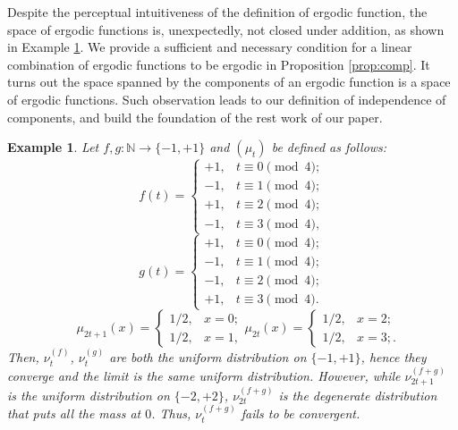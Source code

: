 \documentclass[twoside]{article}
\renewcommand{\natural}{\mathbb{N}}
\newtheorem{example}[lemma]{Example}
\theoremstyle{definition}
\begin{document}
Despite the perceptual intuitiveness of the definition of ergodic function, the space of ergodic functions is, unexpectedly, not closed under addition, as shown in Example \ref{eg:ergodic}. 
We provide a sufficient and necessary condition for a linear combination 
of ergodic functions to be ergodic in Proposition \ref{prop:comp}. 
It turns out the space spanned by the components of an ergodic function is a space of ergodic functions.
Such observation leads to our definition of independence of components, and build the foundation of the rest work of our paper.
\begin{example}
\label{eg:ergodic}
Let $f,g:\natural \rightarrow \{-1,+1\}$ and $(\mu_t)$ be defined as follows: 
\[
f(t) = \begin{cases} +1, & t \equiv 0 \pmod 4; \\
					-1, & t \equiv 1 \pmod 4; \\
					+1,  & t \equiv 2  \pmod 4; \\
					-1, & t \equiv 3  \pmod 4,
					\end{cases}
					\]\[
g(t) = \begin{cases} +1, & t\equiv 0 \pmod 4; \\
					-1, & t\equiv 1 \pmod 4; \\
					-1,  & t\equiv 2 \pmod 4; \\
					+1, & t\equiv 3 \pmod 4.
					\end{cases}
\]
\[
\quad \mu_{2t+1}(x) = \begin{cases} 1/2, & x=0; \\
					1/2, & x=1, 
					\end{cases}
\mu_{2t}(x) = \begin{cases} 1/2, & x=2; \\
					1/2, & x=3;.
					\end{cases}
\]
Then, $\nu^{(f)}_t$, $\nu^{(g)}_t$ are both the uniform  distribution on $\{-1,+1\}$, hence they converge and the limit is the same uniform  distribution. 
However, while $\nu^{(f+g)}_{2t+1}$ is the uniform  distribution on $\{-2,+2\}$,  $\nu^{(f+g)}_{2t}$ is the degenerate
distribution that puts all the mass at $0$. Thus, $\nu^{(f+g)}_{t}$ fails to be convergent. 
\end{example}
\end{document}
